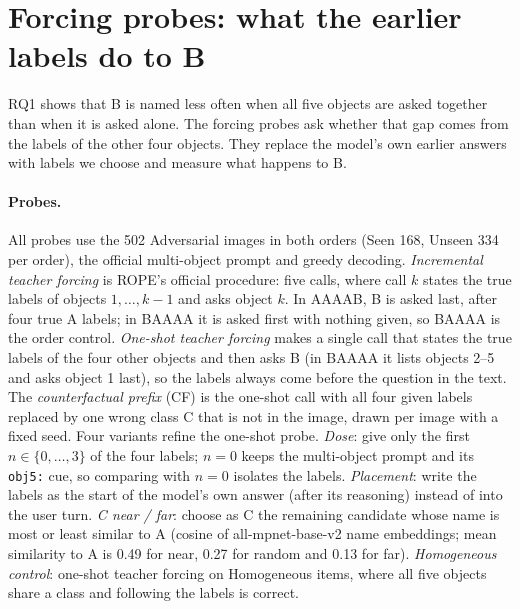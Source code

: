 \providecommand{\tbd}{\textcolor{red}{TBD}}

\section{Forcing probes: what the earlier labels do to B}
\label{sec:forcing}

RQ1 shows that B is named less often when all five objects are asked together than when it is asked
alone. The forcing probes ask whether that gap comes from the labels of the other four objects. They
replace the model's own earlier answers with labels we choose and measure what happens to B.

\paragraph{Probes.} All probes use the 502 Adversarial images in both orders (Seen 168, Unseen 334 per
order), the official multi-object prompt and greedy decoding. \emph{Incremental teacher forcing} is
ROPE's official procedure: five calls, where call $k$ states the true labels of objects $1,\dots,k-1$
and asks object $k$. In AAAAB, B is asked last, after four true A labels; in BAAAA it is asked first
with nothing given, so BAAAA is the order control. \emph{One-shot teacher forcing} makes a single call
that states the true labels of the four other objects and then asks B (in BAAAA it lists objects 2--5
and asks object 1 last), so the labels always come before the question in the text. The
\emph{counterfactual prefix} (CF) is the one-shot call with all four given labels replaced by one wrong
class C that is not in the image, drawn per image with a fixed seed. Four variants refine the one-shot
probe. \emph{Dose}: give only the first $n\in\{0,\dots,3\}$ of the four labels; $n=0$ keeps the
multi-object prompt and its \texttt{obj5:} cue, so comparing with $n=0$ isolates the labels.
\emph{Placement}: write the labels as the start of the model's own answer (after its reasoning)
instead of into the user turn. \emph{C near / far}: choose as C the remaining candidate whose name is
most or least similar to A (cosine of all-mpnet-base-v2 name embeddings; mean similarity to A is 0.49
for near, 0.27 for random and 0.13 for far). \emph{Homogeneous control}: one-shot teacher forcing on
Homogeneous items, where all five objects share a class and following the labels is correct.

